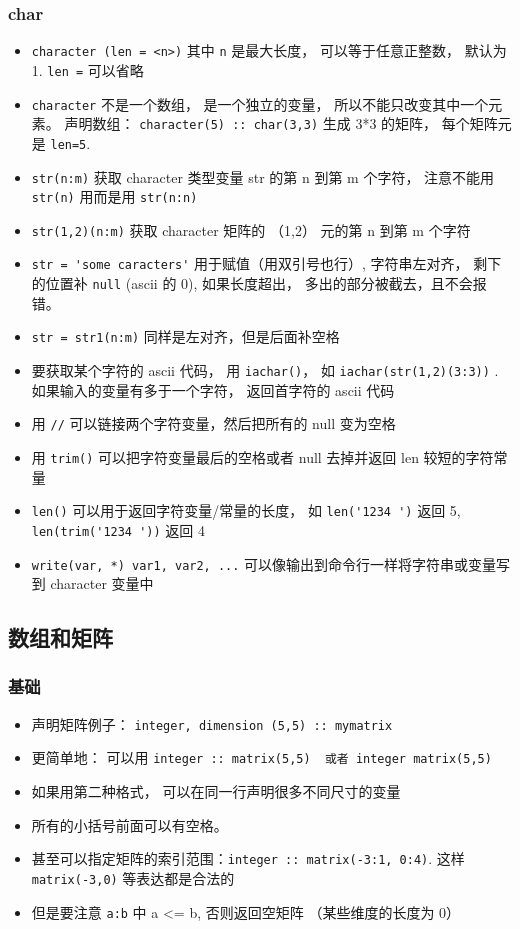 \subsubsection{char}
\begin{itemize}
\item \verb`character (len = <n>)` 其中 \verb|n| 是最大长度， 可以等于任意正整数， 默认为 1.  \verb`len =` 可以省略
\item \verb|character| 不是一个数组， 是一个独立的变量， 所以不能只改变其中一个元素。 声明数组： \verb|character(5) :: char(3,3)| 生成 3*3 的矩阵， 每个矩阵元是 \verb|len=5|.
\item \verb`str(n:m)` 获取 character 类型变量 str 的第 n 到第 m 个字符， 注意不能用 \verb|str(n)| 用而是用 \verb|str(n:n)|
\item \verb`str(1,2)(n:m)` 获取 character 矩阵的 （1,2） 元的第 n 到第 m 个字符
\item \verb`str = 'some caracters'` 用于赋值（用双引号也行）, 字符串左对齐， 剩下的位置补 \verb|null| (ascii 的 0), 如果长度超出， 多出的部分被截去，且不会报错。
\item \verb|str = str1(n:m)| 同样是左对齐，但是后面补空格
\item 要获取某个字符的 ascii 代码， 用 \verb|iachar()|， 如 \verb|iachar(str(1,2)(3:3))| . 如果输入的变量有多于一个字符， 返回首字符的 ascii 代码
\item 用 \verb`//` 可以链接两个字符变量，然后把所有的 null 变为空格
\item 用 \verb`trim()` 可以把字符变量最后的空格或者 null 去掉并返回 len 较短的字符常量
\item \verb`len()` 可以用于返回字符变量/常量的长度， 如 \verb|len('1234 ')| 返回 5, \verb|len(trim('1234 '))| 返回 4
\item \verb`write(var, *) var1, var2, ...` 可以像输出到命令行一样将字符串或变量写到 character 变量中
\end{itemize}

\subsection{数组和矩阵}
\subsubsection{基础}
\begin{itemize}
\item 声明矩阵例子：  \verb`integer, dimension (5,5) :: mymatrix`
\item 更简单地： 可以用 \verb`integer :: matrix(5,5)  或者 integer matrix(5,5)`
\item 如果用第二种格式， 可以在同一行声明很多不同尺寸的变量
\item 所有的小括号前面可以有空格。
\item 甚至可以指定矩阵的索引范围：\verb|integer :: matrix(-3:1, 0:4)|. 这样 \verb|matrix(-3,0)| 等表达都是合法的
\item 但是要注意 \verb`a:b` 中 a <= b, 否则返回空矩阵 （某些维度的长度为 0）
\end{itemize}

